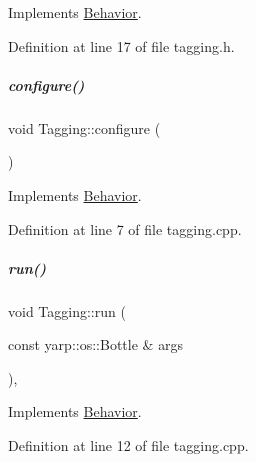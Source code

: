 Implements \hyperlink{group__behaviorManager_affd22d1516cd32ff4f42694a1e6f9ab1}{Behavior}.



Definition at line 17 of file tagging.\+h.

\mbox{\label{group__behaviorManager_a6a67413f90a70012ffc2e67074728c0a}} 
\subparagraph{\texorpdfstring{configure()}{configure()}}
{\footnotesize\ttfamily void Tagging\+::configure (\begin{DoxyParamCaption}{ }\end{DoxyParamCaption})\hspace{0.3cm}{\ttfamily [virtual]}}



Implements \hyperlink{group__behaviorManager_a30484d4d6de3c0689de4f60da3efbab8}{Behavior}.



Definition at line 7 of file tagging.\+cpp.

\mbox{\label{group__behaviorManager_a8427d7f479b580bbf54030015b506374}} 
\subparagraph{\texorpdfstring{run()}{run()}}
{\footnotesize\ttfamily void Tagging\+::run (\begin{DoxyParamCaption}\item[{const yarp\+::os\+::\+Bottle \&}]{args }\end{DoxyParamCaption})\hspace{0.3cm}{\ttfamily [protected]}, {\ttfamily [virtual]}}



Implements \hyperlink{group__behaviorManager_a7dfd81b30f9ddf1864093626650751c3}{Behavior}.



Definition at line 12 of file tagging.\+cpp.


